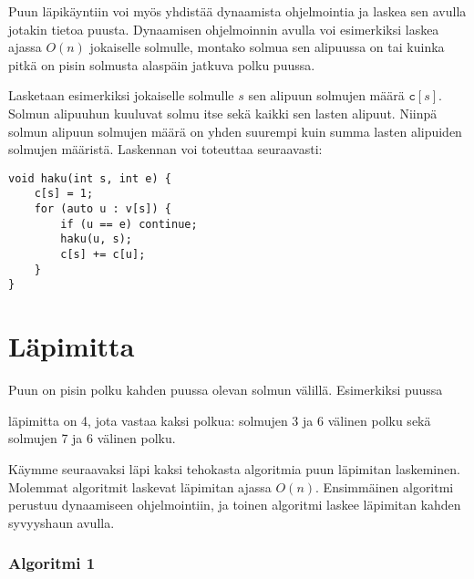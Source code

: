 Puun läpikäyntiin voi myös yhdistää dynaamista
ohjelmointia ja laskea sen avulla jotakin tietoa puusta.
Dynaamisen ohjelmoinnin avulla voi esimerkiksi
laskea ajassa $O(n)$ jokaiselle solmulle,
montako solmua sen alipuussa
on tai kuinka pitkä on pisin solmusta
alaspäin jatkuva polku puussa.

Lasketaan esimerkiksi jokaiselle solmulle $s$
sen alipuun solmujen määrä $\texttt{c}[s]$.
Solmun alipuuhun kuuluvat solmu itse
sekä kaikki sen lasten alipuut.
Niinpä solmun alipuun solmujen määrä on
yhden suurempi kuin summa lasten
alipuiden solmujen määristä.
Laskennan voi toteuttaa seuraavasti:

\begin{lstlisting}
void haku(int s, int e) {
    c[s] = 1;
    for (auto u : v[s]) {
        if (u == e) continue;
        haku(u, s);
        c[s] += c[u];
    }
}
\end{lstlisting}

\section{Läpimitta}


Puun  on pisin polku
kahden puussa olevan solmun välillä.
Esimerkiksi puussa
\begin{center}
\end{center}
läpimitta on 4, jota vastaa kaksi polkua:
solmujen 3 ja 6 välinen polku sekä
solmujen 7 ja 6 välinen polku.

Käymme seuraavaksi läpi kaksi tehokasta
algoritmia puun läpimitan laskeminen.
Molemmat algoritmit laskevat läpimitan ajassa
$O(n)$.
Ensimmäinen algoritmi perustuu dynaamiseen
ohjelmointiin, ja toinen algoritmi
laskee läpimitan kahden syvyyshaun avulla.

\subsubsection{Algoritmi 1}

